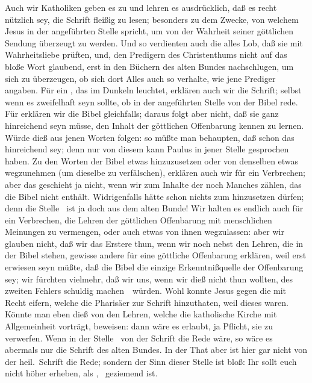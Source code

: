 \begin{aufza}
\item[\RWbet{Widerlegung.}] Auch wir Katholiken geben es zu und lehren es ausdrücklich, daß es recht nützlich sey, die Schrift fleißig zu lesen; besonders zu dem Zwecke, von welchem Jesus in der angeführten Stelle spricht, um von der Wahrheit seiner göttlichen Sendung überzeugt zu werden. Und so verdienten auch die  alles Lob, daß sie mit Wahrheitsliebe prüften, und, den Predigern des Christenthums nicht auf das bloße Wort glaubend, erst in den Büchern des alten Bundes nachschlugen, um sich zu überzeugen, ob sich dort Alles auch so verhalte, wie jene Prediger angaben. Für ein , das im Dunkeln leuchtet, erklären auch wir die Schrift; selbst wenn es zweifelhaft seyn sollte, ob  in der angeführten Stelle von der Bibel rede. Für  erklären wir die Bibel gleichfalls; daraus folgt aber nicht, daß sie ganz hinreichend seyn müsse, den Inhalt der göttlichen Offenbarung kennen zu lernen. Würde dieß aus jenen Worten folgen: so müßte man behaupten, daß schon das  hinreichend sey; denn nur von diesem kann Paulus in jener Stelle gesprochen haben. Zu den Worten der Bibel etwas hinzuzusetzen oder von denselben etwas wegzunehmen (um dieselbe zu verfälschen), erklären auch wir für ein Verbrechen; aber das geschieht ja nicht, wenn wir zum Inhalte der  noch Manches zählen, das die Bibel nicht enthält. Widrigenfalls hätte schon  nichts zum  hinzusetzen dürfen; denn die Stelle \ ist ja doch aus dem alten Bunde! Wir halten es endlich auch für ein Verbrechen, die Lehren der göttlichen Offenbarung mit menschlichen Meinungen zu vermengen, oder auch etwas von ihnen wegzulassen: aber wir glauben nicht, daß wir das Erstere thun, wenn wir noch nebst den Lehren, die in der Bibel stehen, gewisse andere für eine göttliche Offenbarung erklären, weil erst erwiesen seyn müßte, daß die Bibel die einzige Erkenntnißquelle der Offenbarung sey; wir fürchten vielmehr, daß wir uns, wenn wir dieß nicht thun wollten, des zweiten Fehlers schuldig machen~\ würden. Wohl konnte Jesus gegen die  mit Recht eifern, welche die Pharisäer zur Schrift hinzuthaten, weil dieses  waren. Könnte man eben dieß von den Lehren, welche die katholische Kirche mit Allgemeinheit vorträgt, beweisen: dann wäre es erlaubt, ja Pflicht, sie zu verwerfen. Wenn in der Stelle \  von der Schrift die Rede wäre, so wäre es abermals nur die Schrift des alten Bundes. In der That aber ist hier gar nicht von der heil.\ Schrift die Rede; sondern der Sinn dieser Stelle ist bloß: Ihr sollt euch nicht höher erheben, als , \dh\ geziemend ist.

\end{aufza}
